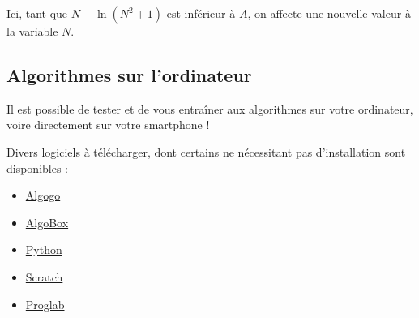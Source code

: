 	\begin{tip}
		Ici, tant que $N - \ln(N^2 + 1)$ est inférieur à $A$, on affecte une nouvelle valeur à la variable $N$.
	\end{tip}
	
	\begin{nosummary}
		\section{Algorithmes sur l'ordinateur}
		
		Il est possible de tester et de vous entraîner aux algorithmes sur votre ordinateur, voire directement sur votre smartphone !
		
		\begin{tip}
			Divers logiciels à télécharger, dont certains ne nécessitant pas d'installation sont disponibles :
			\begin{itemize}
				\item \href{https://www.algogo.xyz}{Algogo}
				\item \href{http://www.xm1math.net/algobox/}{AlgoBox}
				\item \href{https://python.org}{Python}
				\item \href{https://scratch.mit.edu/}{Scratch}
				\item \href{http://proglab.fr/}{Proglab}
			\end{itemize}
		\end{tip}
	\end{nosummary}
